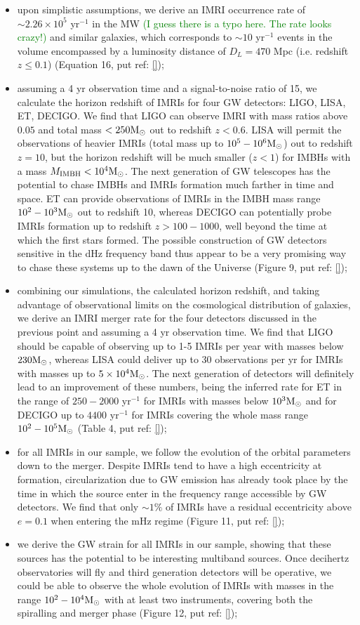 \documentclass[twocolumn]{aastex62}
\newcommand{\Ms}{{\rm M}_\odot}
\newcommand{\ibh}{{\rm IMBH}}
\newcommand{\xian}{\textcolor{green}}
\begin{document}
\begin{itemize}
\item upon simplistic assumptions, we derive an IMRI occurrence rate of $\sim 2.26\times 10^5$ yr$^{-1}$ in the MW \xian{(I guess there is a typo here. The rate looks crazy!)} 
and similar galaxies, which corresponds to $\sim 10$ yr$^{-1}$ events in the volume encompassed by a luminosity distance of $D_L = 470$ Mpc (i.e. redshift $z\leq 0.1$) (Equation 16, put ref: \ref{});
\item assuming a 4 yr observation time and a signal-to-noise ratio of 15, we calculate the horizon redshift of IMRIs for four GW detectors: LIGO, LISA, ET, DECIGO. We find that LIGO can observe IMRI with mass ratios above $0.05$ and total mass $<250\Ms$ out to redshift $z<0.6$. LISA will permit the observations of heavier IMRIs (total mass up to $10^5-10^6\Ms$) out to redshift $z=10$, but the horizon redshift will be much smaller ($z < 1$) for IMBHs with a mass $M_\ibh<10^4\Ms$. The next generation of GW telescopes has the potential to chase IMBHs and IMRIs formation much farther in time and space. ET can provide observations of IMRIs in the IMBH mass range $10^2-10^3\Ms$ out to redshift 10, whereas DECIGO can potentially probe IMRIs formation up to redshift $z > 100-1000$, well beyond the time at which the first stars formed. The possible construction of GW detectors sensitive in the dHz frequency band thus appear to be a very promising way to chase these systems up to the dawn of the Universe (Figure 9, put ref: \ref{});
\item combining our simulations, the calculated horizon redshift, and taking advantage of observational limits on the cosmological distribution of galaxies, we derive an IMRI merger rate for the four detectors discussed in the previous point and assuming a 4 yr observation time. We find that LIGO should be capable of observing up to 1-5 IMRIs per year with masses below $230\Ms$, whereas LISA could deliver up to 30 observations per yr for IMRIs with masses up to $5\times 10^4\Ms$. The next generation of detectors will definitely lead to an improvement of these numbers, being the inferred rate for ET in the range of $250-2000$ yr$^{-1}$ for IMRIs with masses below $10^3\Ms$ and for DECIGO up to $4400$ yr$^{-1}$ for IMRIs covering the whole mass range $10^2-10^5\Ms$ (Table 4, put ref: \ref{});
\item for all IMRIs in our sample, we follow the evolution of the orbital parameters down to the merger. Despite IMRIs tend to have a high eccentricity at formation, circularization due to GW emission has already took place by the time in which the source enter in the frequency range accessible by GW detectors. We find that only $\sim 1\%$ of IMRIs have a residual eccentricity above $e = 0.1$ when entering the mHz regime (Figure 11, put ref: \ref{});
\item we derive the GW strain for all IMRIs in our sample, showing that these sources has the potential to be interesting multiband sources. Once decihertz observatories will fly and third generation detectors will be operative, we could be able to observe the whole evolution of IMRIs with masses in the range $10^2-10^4\Ms$ with at least two instruments, covering both the spiralling and merger phase (Figure 12, put ref: \ref{});  
  

\end{itemize}
\end{document}
